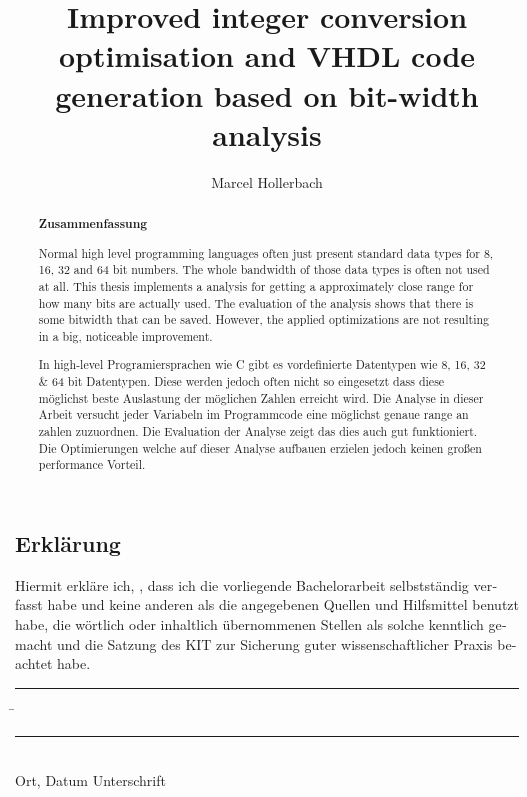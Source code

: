 \documentclass[parskip=full,12pt,a4paper,twoside,headings=openright]{scrreprt}
\title{Improved integer conversion optimisation and VHDL code generation based on bit-width analysis}
\author{Marcel Hollerbach}
\begin{document}
\begin{otherlanguage}{ngerman} %
\mytitlepage
\end{otherlanguage}

\begin{abstract}
\begin{center}\Huge\textbf{\textsf{Zusammenfassung}}
\end{center}
\vfill

Normal high level programming languages often just present standard data types for 8, 16, 32 and 64 bit numbers. The whole bandwidth of those data types is often not used at all. This thesis implements a analysis for getting a approximately close range for how many bits are actually used. The evaluation of the analysis shows that there is some bitwidth that can be saved. However, the applied optimizations are not resulting in a big, noticeable improvement.

\vfill

In high-level Programiersprachen wie C gibt es vordefinierte Datentypen wie 8, 16, 32 \& 64 bit Datentypen. Diese werden jedoch often nicht so eingesetzt dass diese möglichst beste Auslastung der möglichen Zahlen erreicht wird. Die Analyse in dieser Arbeit versucht jeder Variabeln im Programmcode eine möglichst genaue range an zahlen zuzuordnen. Die Evaluation der Analyse zeigt das dies auch gut funktioniert. Die Optimierungen welche auf dieser Analyse aufbauen erzielen jedoch keinen großen performance Vorteil. 

\end{abstract}

\tableofcontents










\begin{otherlanguage}{ngerman}
\chapter*{Erklärung}
\pagestyle{empty}

  \vspace{20mm}
  Hiermit erkläre ich, \theauthor, dass ich die vorliegende Bachelorarbeit selbst\-ständig
verfasst habe und keine anderen als die angegebenen Quellen und Hilfsmittel
benutzt habe, die wörtlich oder inhaltlich übernommenen Stellen als solche kenntlich gemacht und
die Satzung des KIT zur Sicherung guter wissenschaftlicher Praxis beachtet habe.
  \vspace{20mm}
  \begin{tabbing}
  \rule{4cm}{.4pt}\hspace{1cm} \= \rule{7cm}{.4pt} \\
 Ort, Datum \> Unterschrift
  \end{tabbing}
\end{otherlanguage}

\pagestyle{fancy}
\appendix


\end{document}
